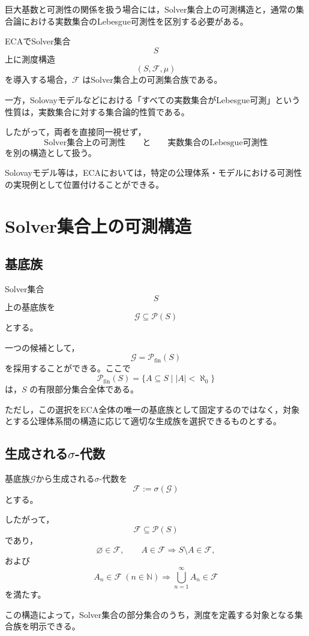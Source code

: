 \documentclass[12pt,a4paper]{article}
\begin{document}
巨大基数と可測性の関係を扱う場合には，Solver集合上の可測構造と，通常の集合論における実数集合のLebesgue可測性を区別する必要がある。

ECAでSolver集合
\[
S
\]
上に測度構造
\[
(S,\mathcal F,\mu)
\]
を導入する場合，$\mathcal F$ はSolver集合上の可測集合族である。

一方，Solovayモデルなどにおける「すべての実数集合がLebesgue可測」という性質は，実数集合に対する集合論的性質である。

したがって，両者を直接同一視せず，
\[
\text{Solver集合上の可測性}
\qquad\text{と}\qquad
\text{実数集合のLebesgue可測性}
\]
を別の構造として扱う。

Solovayモデル等は，ECAにおいては，特定の公理体系・モデルにおける可測性の実現例として位置付けることができる。

\section{Solver集合上の可測構造}

\subsection{基底族}

Solver集合
\[
S
\]
上の基底族を
\[
\mathcal G\subseteq\mathcal P(S)
\]
とする。

一つの候補として，
\[
\mathcal G=\mathcal P_{\mathrm{fin}}(S)
\]
を採用することができる。ここで
\[
\mathcal P_{\mathrm{fin}}(S)
=
\{A\subseteq S\mid |A|<\aleph_0\}
\]
は，$S$ の有限部分集合全体である。

ただし，この選択をECA全体の唯一の基底族として固定するのではなく，対象とする公理体系間の構造に応じて適切な生成族を選択できるものとする。

\subsection{生成される$\sigma$-代数}

基底族$\mathcal G$から生成される$\sigma$-代数を
\[
\mathcal F:=\sigma(\mathcal G)
\]
とする。

したがって，
\[
\mathcal F\subseteq\mathcal P(S)
\]
であり，
\[
\varnothing\in\mathcal F,
\qquad
A\in\mathcal F\Rightarrow S\setminus A\in\mathcal F,
\]
および
\[
A_n\in\mathcal F\ (n\in\mathbb N)
\Rightarrow
\bigcup_{n=1}^{\infty}A_n\in\mathcal F
\]
を満たす。

この構造によって，Solver集合の部分集合のうち，測度を定義する対象となる集合族を明示できる。
\end{document}
